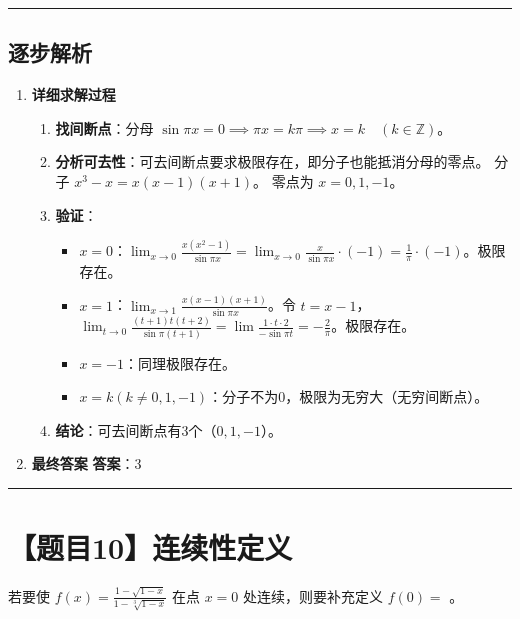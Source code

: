 \documentclass[UTF8]{ctexart}
\newenvironment{redenv}{\color{red}}{}
\newenvironment{detailedanalysis}{%
    \color{red}
    \begin{enumerate}[label=\textbf{第\arabic*步：}, leftmargin=*, align=left, itemsep=1.5ex]
}{%
    \end{enumerate}
}
\newcommand{\problemrule}{\noindent\rule{\textwidth}{1.5pt}\vspace{-0.8em}}
\newcommand{\analysisrule}{\noindent\rule{\textwidth}{0.8pt}\vspace{-0.8em}}
\newcommand{\blank}[1]{\underline{\hspace{#1}}}
\begin{document}
\begin{redenv}
\analysisrule
\subsection*{逐步解析}

\begin{detailedanalysis}
\item \textbf{详细求解过程}
\begin{enumerate}[label=(\arabic*)]
\item \textbf{找间断点}：分母 $\sin\pi x = 0 \implies \pi x = k\pi \implies x = k \quad (k \in \mathbb{Z})$。
\item \textbf{分析可去性}：可去间断点要求极限存在，即分子也能抵消分母的零点。
分子 $x^3 - x = x(x-1)(x+1)$。
零点为 $x=0, 1, -1$。
\item \textbf{验证}：
\begin{itemize}
    \item $x=0$：$\lim_{x \to 0} \frac{x(x^2-1)}{\sin\pi x} = \lim_{x \to 0} \frac{x}{\sin\pi x} \cdot (-1) = \frac{1}{\pi} \cdot (-1)$。极限存在。
    \item $x=1$：$\lim_{x \to 1} \frac{x(x-1)(x+1)}{\sin\pi x}$。令 $t=x-1$，$\lim_{t \to 0} \frac{(t+1)t(t+2)}{\sin\pi(t+1)} = \lim \frac{1 \cdot t \cdot 2}{-\sin\pi t} = -\frac{2}{\pi}$。极限存在。
    \item $x=-1$：同理极限存在。
    \item $x=k (k \neq 0, 1, -1)$：分子不为0，极限为无穷大（无穷间断点）。
\end{itemize}
\item \textbf{结论}：可去间断点有3个（$0, 1, -1$）。
\end{enumerate}

\item \textbf{最终答案}
\textbf{答案}：3
\end{detailedanalysis}
\end{redenv}

\problemrule
\section*{【题目10】连续性定义}
若要使 $ f(x)=\frac{1-\sqrt{1-x}}{1-\sqrt[3]{1-x}} $ 在点 $ x=0 $ 处连续，则要补充定义 $ f(0)= $ \blank{2cm}。
\end{document}
